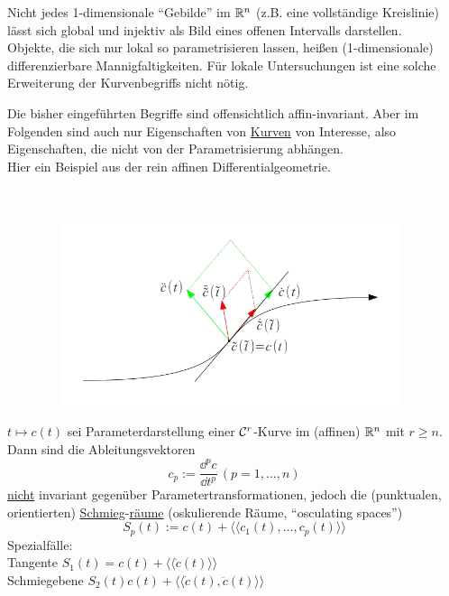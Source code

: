 \begin{bemerkung}
 Nicht jedes 1-dimensionale "`Gebilde"' im \(\mathbb{R}^n\) (z.B. eine vollständige Kreislinie) lässt sich global und injektiv als Bild eines offenen Intervalls darstellen. \\
 Objekte, die sich nur lokal so parametrisieren lassen, heißen (1-dimensionale) differenzierbare Mannigfaltigkeiten. Für lokale Untersuchungen ist eine solche Erweiterung der Kurvenbegriffs nicht nötig.
\end{bemerkung}

Die bisher eingeführten Begriffe sind offensichtlich affin-invariant. Aber im Folgenden sind auch nur Eigenschaften von \uline{Kurven} von Interesse, also Eigenschaften, die nicht von der Parametrisierung abhängen. \\
Hier ein Beispiel aus der rein affinen Differentialgeometrie. 
\begin{bsp}\(\)
\begin{figure}[ht]
 \centering
 \includegraphics[width=11cm, height=5.5cm]{Bilder/Bsp1.jpg}
\end{figure} 
\end{bsp}

\begin{satz}\label{satz111}
 \(t \mapsto c(t)\) sei Parameterdarstellung einer \(\mathcal{C}^r\)-Kurve im (affinen) \(\mathbb{R}^n\) mit \(r \ge n\). Dann sind die Ableitungsvektoren 
 \[
  c_p:= \frac{\dd^p c}{\dd t^p} \, (p=1,\dots, n)
 \]
\uline{nicht} invariant gegenüber Parametertransformationen, jedoch die (punktualen, orientierten) \uline{Schmieg}-\uline{räume} (oskulierende Räume, "`osculating spaces"') 
\[
 S_p(t):= c(t) + \langle \langle c_1(t), \dots , c_p(t) \rangle \rangle
\]
Spezialfälle: \\
Tangente \(S_1(t)=c(t) + \langle \langle \dot c(t) \rangle \rangle \) \\
Schmiegebene \( S_2(t) c(t) + \langle \langle \dot c(t), \ddot c(t) \rangle \rangle \)
\end{satz}

